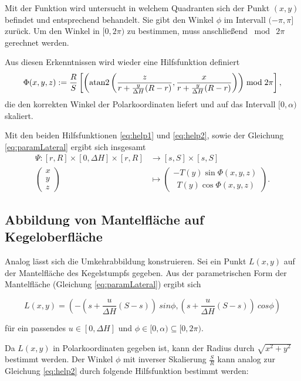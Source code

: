 Mit der Funktion wird untersucht in welchem Quadranten sich der Punkt $(x,y)$ befindet und entsprechend behandelt. Sie gibt den Winkel $\phi$ im Intervall $(-\pi, \pi]$ zurück.
Um den Winkel in $[0,2\pi)$ zu bestimmen, muss anschließend $\bmod~2\pi$ gerechnet werden.

Aus diesen Erkenntnissen wird wieder eine Hilfsfunktion definiert
\begin{equation} \label{eq:help2}
\Phi(x,y,z) := \frac{R}{S} \left[\left(\text{atan2}\left(\frac{z}{r + \frac{y}{\Delta H} (R - r)}, \frac{x}{r + \frac{y}{\Delta H} (R - r)}\right)\right) \bmod 2\pi \right],
\end{equation}
die den korrekten Winkel der Polarkoordinaten liefert und auf das Intervall $[0, \alpha)$ skaliert.

Mit den beiden Hilfsfunktionen \ref{eq:help1} und \ref{eq:help2}, sowie der Gleichung \ref{eq:paramLateral} ergibt sich insgesamt
\begin{equation}\label{eq:coneToLateral}
\begin{aligned}
\Psi \colon [r,R] \times [0, \Delta H] \times [r,R] &\to [s,S] \times [s,S]\\
\begin{pmatrix}
x \\ y \\ z
\end{pmatrix}  &\mapsto
\begin{pmatrix}
-T(y)\sin \Phi(x,y,z)\\
 ~~T(y)\cos\Phi(x,y,z)
\end{pmatrix}.
\end{aligned}
\end{equation}

\subsection{Abbildung von Mantelfläche auf Kegeloberfläche}

Analog lässt sich die Umkehrabbildung konstruieren.
Sei ein Punkt $L(x,y)$ auf der Mantelfläche des Kegelstumpfs gegeben. Aus der parametrischen Form der Mantelfläche (Gleichung \ref{eq:paramLateral}) ergibt sich

\[
L(x,y) = (-(s + \frac{u}{\Delta H}(S-s)) ~sin \phi, (s + \frac{u}{\Delta H} (S-s)) ~cos \phi)
\]

für ein passendes $u\in [0, \Delta H]$ und $\phi \in [0, \alpha) \subseteq  [0, 2\pi)$.

Da $L(x,y)$ in Polarkoordinaten gegeben ist, kann der Radius durch $\sqrt{x^2+y^2}$ bestimmt werden. Der Winkel $\phi$ mit inverser Skalierung $\frac{S}{R}$ kann analog zur Gleichung \ref{eq:help2} durch folgende Hilfsfunktion bestimmt werden:

